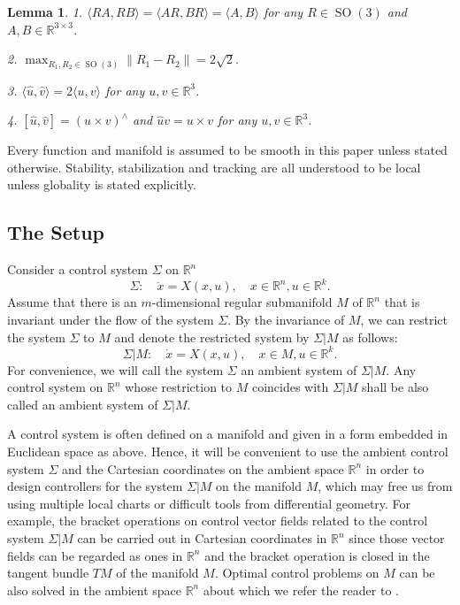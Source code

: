 \documentclass[letterpaper, 10 pt, conference]{ieeeconf}  %
\newtheorem{lemma}[theorem]{Lemma}
\newcommand{\Sym}{\mathrm{Sym}}
\newcommand{\Skew}{\mathrm{Skew}}
\newcommand{\SO}{\operatorname{SO}(3)}
\newcommand{\dimu}{{k}}
\begin{document}
\begin{lemma}\label{lemma:prelim}
1. $\langle R A, R B\rangle = \langle AR, BR\rangle  = \langle A, B\rangle$   for any $R \in \SO$ and $A,B \in \mathbb R^{3\times 3}$.




2. $\max_{R_1, R_2 \in \SO}\| R_1 - R_2\| = 2\sqrt 2$. 

3. $\langle \hat u, \hat v \rangle = 2 \langle u, v\rangle$ for any $u, v \in \mathbb R^3$.

4. $[\hat u, \hat v]= (u \times v)^\wedge$  and $\hat u v = u \times v$ for any $u, v \in \mathbb R^3$.
\end{lemma}
 Every function and manifold is assumed to be smooth in this paper unless stated otherwise. Stability, stabilization and tracking are all understood to be local unless globality is stated explicitly. 

\subsection{The Setup}
Consider a control system $\Sigma$ on $\mathbb R^n$
\[
\Sigma: \quad \dot x = X(x,u), \quad x \in \mathbb R^n, u \in \mathbb R^\dimu.
\]
Assume that there is an $m$-dimensional regular submanifold $M$ of $\mathbb R^n$ that is invariant under the flow of the system $\Sigma$. 
 By  the invariance of $M$, we can restrict the system $\Sigma$ to $M$ and denote the restricted system by $\Sigma | M$ as follows:
\begin{equation}\label{Sigma:M}
\Sigma | M: \quad \dot x = X(x,u), \quad x \in  M, u \in \mathbb R^\dimu.
\end{equation}
For convenience, we will call the system $\Sigma$ an ambient system of $\Sigma | M$. Any control system on $\mathbb R^n$ whose restriction to $M$ coincides with $\Sigma | M$ shall be also called an ambient system of $\Sigma |M$.

A control system is often defined on  a manifold   and  given in a form embedded in Euclidean space as above. Hence, it will be convenient to use the ambient control system $\Sigma$  and the Cartesian coordinates on the ambient space $\mathbb R^n$   in order to design controllers for the system $\Sigma | M$ on the manifold $M$, which may  free us from using multiple local charts or  difficult tools from differential geometry.  For example, the bracket operations on control vector fields related to the control system $\Sigma | M$ can be carried out in Cartesian coordinates in $\mathbb R^n$ since those vector fields can be regarded as ones in $\mathbb R^n$ and the bracket operation is closed in the tangent bundle $TM$ of the manifold $M$.  Optimal control problems on $M$ can be also solved in the ambient space $\mathbb R^n$  about which we  refer the reader to \cite{Ch11}.
\end{document}
